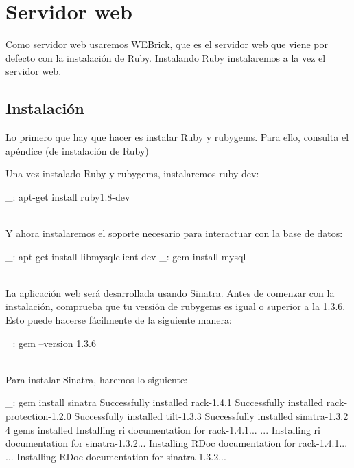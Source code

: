 \chapter{Servidor web}
\label{web:servidor}

Como servidor web usaremos WEBrick, que es el servidor web que viene por defecto con la instalación de Ruby. Instalando Ruby instalaremos a la vez el servidor web.


\section{Instalación}

Lo primero que hay que hacer es instalar Ruby y rubygems. Para ello, consulta el apéndice (de instalación de Ruby)

Una vez instalado Ruby y rubygems, instalaremos ruby-dev:

\begin{bashcode}
_: apt-get install ruby1.8-dev
\end{bashcode}
\\

Y ahora instalaremos el soporte necesario para interactuar con la base de datos:

\begin{bashcode}
_: apt-get install libmysqlclient-dev
_: gem install mysql
\end{bashcode}
\\

La aplicación web será desarrollada usando Sinatra. Antes de comenzar con la instalación, comprueba que tu versión de rubygems es igual o superior a la 1.3.6. Esto puede hacerse fácilmente de la siguiente manera:

\begin{bashcode}
_: gem --version
1.3.6
\end{bashcode}
\\

Para instalar Sinatra, haremos lo siguiente:

\begin{bashcode}
_: gem install sinatra
Successfully installed rack-1.4.1
Successfully installed rack-protection-1.2.0
Successfully installed tilt-1.3.3
Successfully installed sinatra-1.3.2
4 gems installed
Installing ri documentation for rack-1.4.1...
...
Installing ri documentation for sinatra-1.3.2...
Installing RDoc documentation for rack-1.4.1...
...
Installing RDoc documentation for sinatra-1.3.2...
\end{bashcode}
\\

